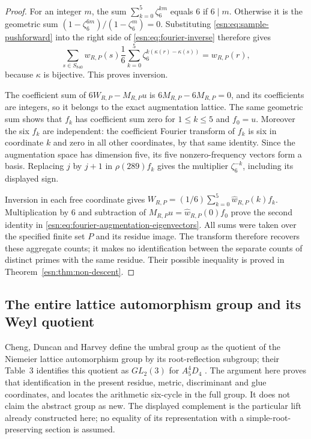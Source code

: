 \begin{proof}
For an integer \(m\), the sum
\(\sum_{k=0}^5\zeta_6^{km}\) equals 6 if \(6\mid m\).
Otherwise it is the geometric sum
\((1-\zeta_6^{6m})/(1-\zeta_6^m)=0\).
Substituting \eqref{esn:eq:sample-pushforward} into the right side
of \eqref{esn:eq:fourier-inverse} therefore gives
\[
 \sum_{s\in S_{840}}w_{R,P}(s)
       \frac16\sum_{k=0}^5
              \zeta_6^{k(\kappa(r)-\kappa(s))}=w_{R,P}(r),
\]
because \(\kappa\) is bijective.  This proves inversion.

The coefficient sum of \(6W_{R,P}-M_{R,P}u\) is
\(6M_{R,P}-6M_{R,P}=0\), and its coefficients are integers, so
it belongs to the exact augmentation lattice.  The same geometric sum
shows that \(f_k\) has coefficient sum zero for \(1\le k\le5\)
and \(f_0=u\).  Moreover the six \(f_k\) are independent: the
coefficient Fourier transform of \(f_k\) is six in coordinate \(k\)
and zero in all other coordinates, by that same identity.  Since the
augmentation space has dimension five, its five nonzero-frequency
vectors form a basis.  Replacing \(j\) by \(j+1\) in
\(\rho(289)f_k\) gives the multiplier \(\zeta_6^{-k}\), including
its displayed sign.

Inversion in each free coordinate gives
\(W_{R,P}=(1/6)\sum_{k=0}^5\widehat w_{R,P}(k)f_k\).
Multiplication by 6 and subtraction of
\(M_{R,P}u=\widehat w_{R,P}(0)f_0\) prove the second identity
in \eqref{esn:eq:fourier-augmentation-eigenvectors}.
All sums were taken over the specified finite set \(P\) and its
residue image.  The transform therefore recovers these aggregate counts;
it makes no identification between the separate counts of distinct
primes with the same residue.  Their possible inequality is proved in
Theorem~\ref{esn:thm:non-descent}.
\end{proof}


\subsection{The entire lattice automorphism group and its Weyl quotient}
\label{esn:fa:subsec:full-automorphisms}

Cheng, Duncan and Harvey define the umbral group as the quotient of
the Niemeier lattice automorphism group by its root-reflection subgroup;
their Table~3 identifies this quotient as \(GL_2(3)\) for
\(A_5^4D_4\) \cite[Section~2.4 and Table~3]{esn:CDH2014}.
The argument here proves that identification in the present residue,
metric, discriminant and glue coordinates, and locates the arithmetic
six-cycle in the full group. It does not claim the abstract group as new.
The displayed complement is the particular lift already constructed here;
no equality of its representation with a simple-root-preserving section
is assumed.


